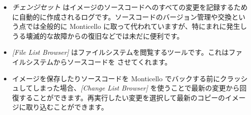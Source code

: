 \documentclass[a4paper,10pt,twoside]{book}
\begin{document}
\begin{itemize}
  \item \emph{チェンジセット} はイメージのソースコードへのすべての変更を記録するために自動的に作成されるログです。ソースコードのバージョン管理や交換という点では全般的に Monticello に取って代われていますが、特にまれに発生しうる壊滅的な故障からの復旧などでは未だに便利です。
  \item \emph{[File List Browser]} はファイルシステムを閲覧するツールです。これはファイルシステムからソースコードを  させてくれます。
  \item イメージを保存したりソースコードを Monticello でバックする前にクラッシュしてしまった場合、\emph{[Change List Browser]} を使うことで最新の変更から回復することができます。再実行したい変更を選択して最新のコピーのイメージに取り込むことができます。
\end{itemize}

\ifx\wholebook\relax\else
\end{document}
